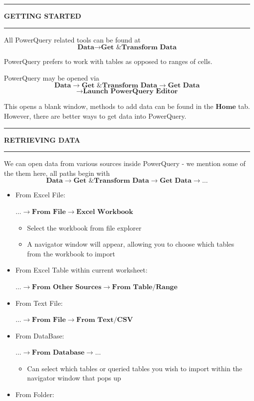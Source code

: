 \documentclass[8pt]{extarticle}
\newcommand{\heading}[1]{%
    \noindent
    \rule{\linewidth}{0.4pt}
    \begin{center}
        \vspace{-1ex}
        \textbf{#1}        
        \vspace{-2.5ex}
    \end{center}
    \rule{\linewidth}{0.4pt}
}
\begin{document}
\begin{multicols}{3}
\setlength{\columnseprule}{1pt} %

\heading{GETTING STARTED}

All PowerQuery related tools can be found at 
\[\textbf{Data} \rightarrow \textbf{Get \& Transform Data} \]

PowerQuery prefers to work with tables as opposed to ranges of cells.

PowerQuery may be opened via 
\[\textbf{Data} \rightarrow \textbf{Get \& Transform Data} \rightarrow \textbf{Get Data} \]
\[\rightarrow \textbf{Launch PowerQuery Editor}\]

This opens a blank window, methods to add data can be found in the $\textbf{Home}$ tab. However, there are better ways to get data into PowerQuery.

\heading{RETRIEVING DATA}

We can open data from various sources inside PowerQuery - we mention some of the them here, all paths begin with 
\[\textbf{Data} \rightarrow \textbf{Get \& Transform Data} \rightarrow \textbf{Get Data} \rightarrow \dots\]
\begin{itemize}
    \item  From Excel File:
    
    $\dots \rightarrow \textbf{From File} \rightarrow \textbf{Excel Workbook}$
    \begin{itemize}
        \item Select the workbook from file explorer
        \item A navigator window will appear, allowing you to choose which tables from the workbook to import
    \end{itemize}
    \item From Excel Table within current worksheet:
    
    $\dots \rightarrow \textbf{From Other Sources} \rightarrow \textbf{From Table/Range}$
    \item From Text File:

    $\dots \rightarrow \textbf{From File} \rightarrow \textbf{From Text/CSV}$
    \columnbreak
    \item From DataBase:

    $\dots \rightarrow \textbf{From Database} \rightarrow \dots$
    \begin{itemize}
        \item Can select which tables or queried tables you wish to import within the navigator window that pops up
    \end{itemize}
    \item From Folder:


\end{itemize}
\end{multicols}
\end{document}
